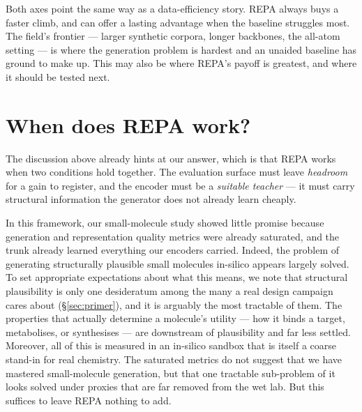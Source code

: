 \documentclass[12pt,a4paper,twoside]{report}
\begin{document}
Both axes point the same way as a data-efficiency story. REPA always buys a faster climb, and can offer a lasting advantage when the baseline struggles most. The field's frontier --- larger synthetic corpora, longer backbones, the all-atom setting --- is where the generation problem is hardest and an unaided baseline has ground to make up. This may also be where REPA's payoff is greatest, and where it should be tested next.

\section{When does REPA work?}
\label{sec:concl-when}

The discussion above already hints at our answer, which is that REPA works when two
conditions hold together. The evaluation surface must leave \emph{headroom} for
a gain to register, and the encoder must be a \emph{suitable teacher} --- it
must carry structural information the generator does not already learn cheaply.

In this framework, our small-molecule study showed little promise because generation and representation quality metrics were already saturated, and the trunk already learned everything our encoders carried. Indeed, the problem of generating structurally plausible small molecules in-silico appears largely solved. To set appropriate expectations about what this means, we note that structural plausibility is only one desideratum among the many a real design campaign cares about (\S\ref{sec:primer}), and it is arguably the most tractable of them. The properties that actually determine a molecule's utility --- how it binds a target, metabolises, or synthesises --- are downstream of plausibility and far less settled. Moreover, all of this is measured in an in-silico sandbox that is itself a coarse stand-in for real chemistry. The saturated metrics do not suggest that we have mastered small-molecule generation, but that one tractable sub-problem of it looks solved under proxies that are far removed from the wet lab. But this suffices to leave REPA nothing to add.
\end{document}
